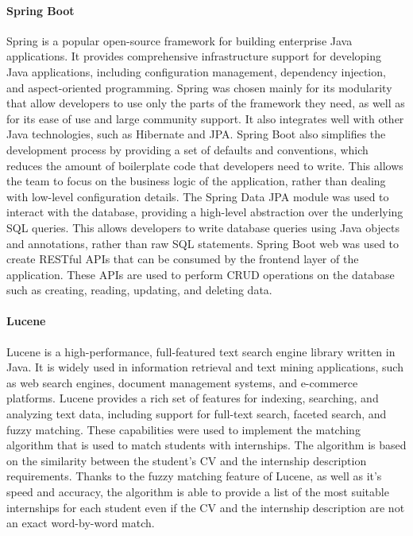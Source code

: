 \paragraph{Spring Boot}
Spring is a popular open-source framework for building enterprise Java applications. It provides comprehensive infrastructure support for developing Java applications, including configuration management, dependency injection, and aspect-oriented programming. Spring was chosen mainly for its modularity that allow developers to use only the parts of the framework they need, as well as for its ease of use and large community support. It also integrates well with other Java technologies, such as Hibernate and JPA.  
Spring Boot also simplifies the development process by providing a set of defaults and conventions, which reduces the amount of boilerplate code that developers need to write. This allows the team to focus on the business logic of the application, rather than dealing with low-level configuration details. The Spring Data JPA module was used to interact with the database, providing a high-level abstraction over the underlying SQL queries. This allows developers to write database queries using Java objects and annotations, rather than raw SQL statements. Spring Boot web was used to create RESTful APIs that can be consumed by the frontend layer of the application. These APIs are used to perform CRUD operations on the database such as creating, reading, updating, and deleting data. 

\paragraph{Lucene}
Lucene is a high-performance, full-featured text search engine library written in Java. It is widely used in information retrieval and text mining applications, such as web search engines, document management systems, and e-commerce platforms. Lucene provides a rich set of features for indexing, searching, and analyzing text data, including support for full-text search, faceted search, and fuzzy matching. These capabilities were used to implement the matching algorithm that is used to match students with internships. The algorithm is based on the similarity between the student's CV and the internship description requirements. Thanks to the fuzzy matching feature of Lucene, as well as it's speed and accuracy, the algorithm is able to provide a list of the most suitable internships for each student even if the CV and the internship description are not an exact word-by-word match.

